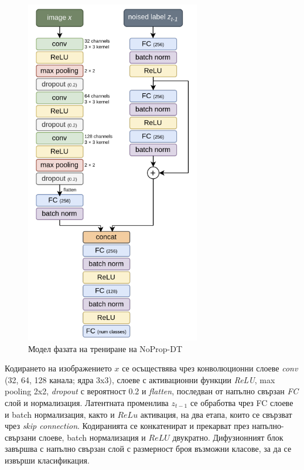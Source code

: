\documentclass[a4paper,11pt]{article}
\begin{document}
\begin{figure}[H]
    \centering
    \includegraphics[width=3.00in,keepaspectratio]{images/NoProp-DT Model.png}
    \caption{Модел фазата на трениране на NoProp-DT}
\end{figure}

Кодирането на изображението \(x\) се осъществява чрез конволюционни слоеве \emph{conv} (32, 64, 128 канала; ядра 3x3), слоеве с активационни функции \emph{ReLU}, max pooling 2x2, \emph{dropout} с вероятност 0.2 и \emph{flatten}, последван от напълно свързан \emph{FC} слой и нормализация. Латентната променлива \(z_{t-1}\) се обработва чрез FC слоеве и batch нормализация, както и \(ReLu\) активация, на два етапа, които се свързват чрез \emph{skip connection}. 
Кодиранията се конкатенират и прекарват през напълно-свързани слоеве, batch нормализация и \(ReLU\) двукратно. 
Дифузионният блок завършва с напълно свързан слой с размерност броя възможни класове, за да се извърши класификация.
\end{document}
